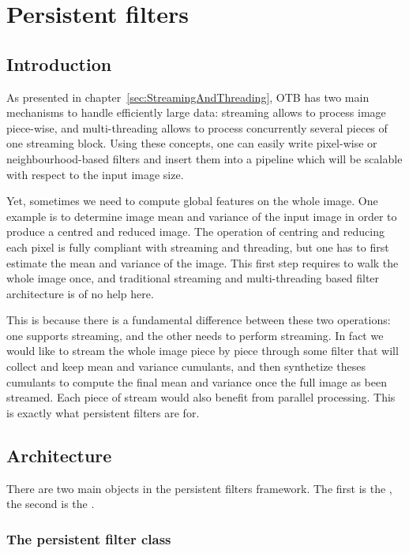 \chapter{Persistent filters}
\label{chapter:PersistentFilters}

\section{Introduction}

As presented in chapter~\ref{sec:StreamingAndThreading}, OTB has two
main mechanisms to handle efficiently large data: streaming allows to
process image piece-wise, and multi-threading allows to process
concurrently several pieces of one streaming block. Using these
concepts, one can easily write pixel-wise or neighbourhood-based
filters and insert them into a pipeline which will be scalable with
respect to the input image size.

Yet, sometimes we need to compute global features on the whole image. One
example is to determine image mean and variance of the input image in
order to produce a centred and reduced image. The operation of
centring and reducing each pixel is fully compliant with streaming and
threading, but one has to first estimate the mean and variance of the
image. This first step requires to walk the whole image once, and
traditional streaming and multi-threading based filter architecture is
of no help here. 

This is because there is a fundamental difference between these two
operations: one supports streaming, and the other needs to perform
streaming. In fact we would like to stream the whole image piece by
piece through some filter that will collect and keep mean and variance
cumulants, and then synthetize theses cumulants to compute the final
mean and variance once the full image as been streamed. Each piece of
stream would also benefit from parallel processing. This is exactly
what persistent filters are for.

\section{Architecture}

There are two main objects in the persistent filters framework. The
first is the , the second is the
.

\subsection{The persistent filter class}

